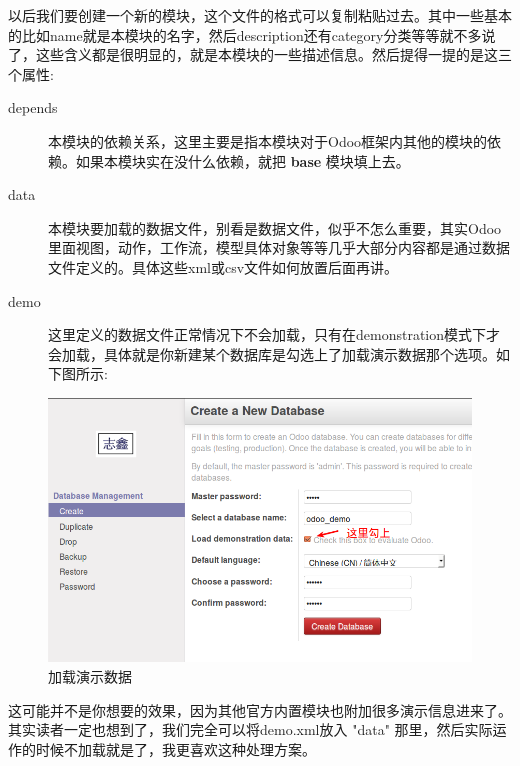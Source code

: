 \documentclass[11pt,a4paper]{sphinxmanual}
\begin{document}
以后我们要创建一个新的模块，这个文件的格式可以复制粘贴过去。其中一些基本的比如name就是本模块的名字，然后description还有category分类等等就不多说了，这些含义都是很明显的，就是本模块的一些描述信息。然后提得一提的是这三个属性:

\begin{description}
\item[{depends}] 本模块的依赖关系，这里主要是指本模块对于Odoo框架内其他的模块的依赖。如果本模块实在没什么依赖，就把 \textbf{base} 模块填上去。
\item[{data}] 本模块要加载的数据文件，别看是数据文件，似乎不怎么重要，其实Odoo里面视图，动作，工作流，模型具体对象等等几乎大部分内容都是通过数据文件定义的。具体这些xml或csv文件如何放置后面再讲。
\item[{demo}] 这里定义的数据文件正常情况下不会加载，只有在demonstration模式下才会加载，具体就是你新建某个数据库是勾选上了加载演示数据那个选项。如下图所示:
\end{description}


\begin{figure}[H]
\centering
\includegraphics[keepaspectratio,max width=0.95\linewidth]{images/加载演示数据.png}
\caption{加载演示数据}
\end{figure}

这可能并不是你想要的效果，因为其他官方内置模块也附加很多演示信息进来了。其实读者一定也想到了，我们完全可以将demo.xml放入 "data" 那里，然后实际运作的时候不加载就是了，我更喜欢这种处理方案。
\end{document}
